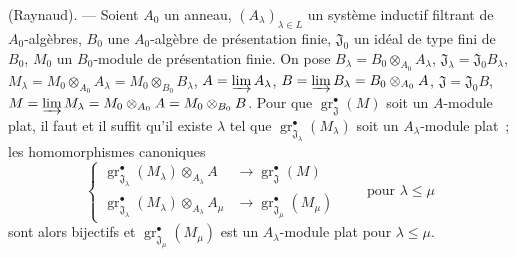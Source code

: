 \begin{theorem}[11.2.9]
(Raynaud). --- Soient $A_0$ un anneau, $(A_\lambda)_{\lambda\in L}$ un système
inductif filtrant de $A_0$-algèbres, $B_0$ une $A_0$-algèbre de présentation
finie, $\mathfrak J_0$ un idéal de type fini de $B_0$, $M_0$ un $B_0$-module
de présentation finie. On pose
$B_\lambda=B_0\otimes_{A_0}A_\lambda$,
$\mathfrak J_\lambda=\mathfrak J_0B_\lambda$,
$M_\lambda=M_0\otimes_{A_0}A_\lambda=M_0\otimes_{B_0}B_\lambda$,
$A=\varinjlim A_\lambda$,
$B=\varinjlim B_\lambda=B_0\otimes_{A_0}A$,
$\mathfrak J=\mathfrak J_0B$,
$M=\varinjlim M_\lambda=M_0\otimes_{A_0}A=M_0\otimes_{B_0}B$. Pour que
$\operatorname{gr}_{\mathfrak J}^\bullet(M)$ soit un $A$-module plat, il faut et il
suffit qu'il existe $\lambda$ tel que
$\operatorname{gr}_{\mathfrak J_\lambda}^\bullet(M_\lambda)$ soit un
$A_\lambda$-module plat~; les homomorphismes canoniques
\begin{equation}
\left\{
\begin{aligned}
\operatorname{gr}_{\mathfrak J_\lambda}^\bullet(M_\lambda)
  \otimes_{A_\lambda}A&\longrightarrow
  \operatorname{gr}_{\mathfrak J}^\bullet(M)\\
\operatorname{gr}_{\mathfrak J_\lambda}^\bullet(M_\lambda)
  \otimes_{A_\lambda}A_\mu&\longrightarrow
  \operatorname{gr}_{\mathfrak J_\mu}^\bullet(M_\mu)
\end{aligned}
\right.
\qquad\text{pour }\lambda\leq\mu
\label{IV.11.2.9.1-fr}
\tag{11.2.9.1}
\end{equation}
sont alors bijectifs et
$\operatorname{gr}_{\mathfrak J_\mu}^\bullet(M_\mu)$ est un $A_\lambda$-module plat
pour $\lambda\leq\mu$.
\end{theorem}

